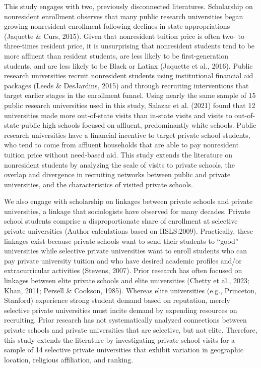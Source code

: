 \documentclass[
  12pt,
]{article}
\begin{document}
This study engages with two, previously disconnected literatures. Scholarship on nonresident enrollment observes that many public research universities began growing nonresident enrollment following declines in state appropriations (Jaquette \& Curs, 2015). Given that nonresident tuition price is often two- to three-times resident price, it is unsurprising that nonresident students tend to be more affluent than resident students, are less likely to be first-generation students, and are less likely to be Black or Latinx (Jaquette et al., 2016). Public research universities recruit nonresident students using institutional financial aid packages (Leeds \& DesJardins, 2015) and through recruiting interventions that target earlier stages in the enrollment funnel. Using nearly the same sample of 15 public research universities used in this study, Salazar et al. (2021) found that 12 universities made more out-of-state visits than in-state visits and visits to out-of-state public high schools focused on affluent, predominantly white schools. Public research universities have a financial incentive to target private school students, who tend to come from affluent households that are able to pay nonresident tuition price without need-based aid. This study extends the literature on nonresident students by analyzing the scale of visits to private schools, the overlap and divergence in recruiting networks between public and private universities, and the characteristics of visited private schools.

We also engage with scholarship on linkages between private schools and private universities, a linkage that sociologists have observed for many decades. Private school students comprise a disproportionate share of enrollment at selective private universities (Author calculations based on HSLS:2009). Practically, these linkages exist because private schools want to send their students to ``good'' universities while selective private universities want to enroll students who can pay private university tuition and who have desired academic profiles and/or extracurricular activities (Stevens, 2007). Prior research has often focused on linkages between elite private schools and elite universities (Chetty et al., 2023; Khan, 2011; Persell \& Cookson, 1985). Whereas elite universities (e.g., Princeton, Stanford) experience strong student demand based on reputation, merely selective private universities must incite demand by expending resources on recruiting. Prior research has not systematically analyzed connections between private schools and private universities that are selective, but not elite. Therefore, this study extends the literature by investigating private school visits for a sample of 14 selective private universities that exhibit variation in geographic location, religious affiliation, and ranking.
\end{document}
